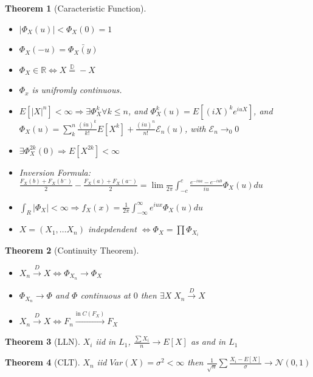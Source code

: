 \documentclass{article}
\newtheorem{theorem}{Theorem}
\begin{document}
\begin{theorem}[Caracteristic Function]
  \begin{itemize}
  \item $|\Phi_X(u)| < \Phi_X(0) = 1$
  \item $\Phi_X(-u) = \bar {\Phi_X(y)}$
  \item $\Phi_X \in \mathbb R \iff X \overset{\mathbb D}{=} -X$
  \item $\Phi_x$ is unifromly continuous.
  \item $E[|X|^n] < \infty \Rightarrow \exists \Phi^{k}_X \forall k \le n$, and $\Phi_X^k(u) = E[(iX)^ke^{iuX}]$, and $\Phi_X(u) = \sum_k^n \frac{(iu)^k}{k!}E[X^k] + \frac{(iu)^n}{n!}\mathcal E_n(u)$, with $\mathcal E_n \rightarrow_0 0$
  \item $\exists \Phi^{2k}_X(0) \Rightarrow E[X^{2k}] < \infty$
  \item Inversion Formula: $\frac{F_X(b) + F_X(b^-)}{2}- \frac{F_X(a) + F_X(a^-)}{2} = \lim \frac{}{2\pi} \int_{-c}^{c} \frac{e^{-iua} - e^{-iub}}{iu}\Phi_X(u) du$
  \item $\int_R |\Phi_X| < \infty \Rightarrow f_X(x) = \frac{1}{2\pi} \int_{-\infty}^{\infty} e^{iux} \Phi_X(u) du$
  \item $X = (X_1, \ldots X_n)$ indepdendent $\iff \Phi_X = \prod \Phi_{X_i}$
  \end{itemize}
\end{theorem}
\begin{theorem}[Continuity Theorem]
  \begin{itemize}
  \item $X_n \overset{D}{\rightarrow} X \iff \Phi_{X_n} \rightarrow \Phi_X$
  \item $\Phi_{X_n} \rightarrow \Phi$ and $\Phi$ continuous at $0$ then $\exists X \; X_n \overset{D}{\rightarrow} X$
  \item $X_n \overset{D}{\rightarrow} X \iff F_n \overset{\text{in} \; C(F_X)}\rightarrow F_X$
  \end{itemize}
\end{theorem}
\begin{theorem}[LLN]
  $X_i$ iid in $L_1$, $\frac{\sum X_i}{n} \rightarrow E[X]$ as and in $L_1$
\end{theorem}
\begin{theorem}[CLT]
  $X_n$ iid $Var(X) = \sigma^2 < \infty$ then $\frac{1}{\sqrt n}\sum \frac{X_i - E[X]}{\sigma} \rightarrow \mathcal N(0, 1)$
\end{theorem}
\end{document}
